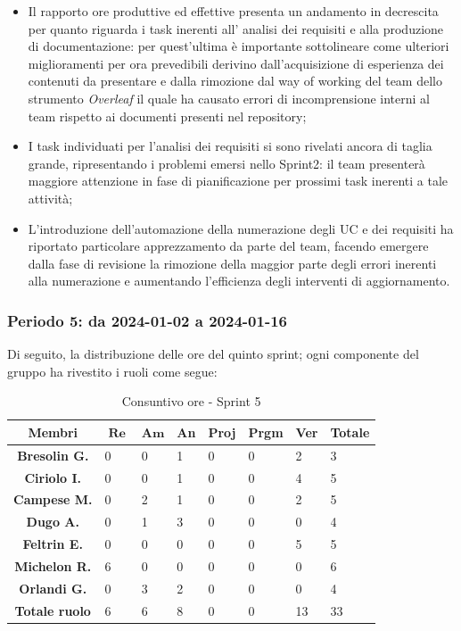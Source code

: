\documentclass[10pt, a4paper]{article}
\begin{document}
{{{{{{{{{{{{{{{{{\begin{itemize}
\item Il rapporto ore produttive ed effettive presenta un andamento in decrescita per quanto riguarda i task inerenti all' analisi dei requisiti e alla produzione di documentazione: per 
quest'ultima è importante sottolineare come ulteriori miglioramenti per ora prevedibili derivino dall'acquisizione di esperienza dei contenuti da presentare e dalla rimozione dal way of working del team
dello strumento \textit{Overleaf} il quale ha causato errori di incomprensione interni al team rispetto ai documenti presenti nel repository;
\item I task individuati per l'analisi dei requisiti si sono rivelati ancora di taglia grande, ripresentando i problemi emersi nello Sprint2: il team presenterà maggiore attenzione
in fase di pianificazione per prossimi task inerenti a tale attività;
\item L'introduzione dell'automazione della numerazione degli UC e dei requisiti ha riportato particolare apprezzamento da parte del team, facendo emergere dalla fase di revisione
la rimozione della maggior parte degli errori inerenti alla numerazione e aumentando l'efficienza degli interventi di aggiornamento. 
\end{itemize}
 

\subsubsection{Periodo 5: da 2024-01-02 a 2024-01-16}
Di seguito, la distribuzione delle ore del quinto sprint; ogni componente del gruppo ha rivestito i ruoli come segue:
\begin{table}[H]
    \begin{tabularx}{\textwidth}{c|X|X|X|X|X|X|X}
        \textbf{Membri} & $\operatorname{\textbf{Re}}$ & $\mathrm{\textbf{Am}}$ & \textbf{An} & \textbf{Proj} & \textbf{Prgm} & \textbf{Ver} & \textbf{Totale} \\
        \hline
        \textbf{Bresolin G.} & 0 & 0 & 1 & 0 & 0 & 2 & 3 \\
        \hline
        \textbf{Ciriolo I.}  & 0 & 0 & 1 & 0 & 0 & 4 & 5 \\
        \hline
        \textbf{Campese M.}  & 0 & 2 & 1 & 0 & 0 & 2 & 5 \\
        \hline
        \textbf{Dugo A.}     & 0 & 1 & 3 & 0 & 0 & 0 & 4 \\
        \hline
        \textbf{Feltrin E.}  & 0 & 0 & 0 & 0 & 0 & 5 & 5 \\
        \hline
        \textbf{Michelon R.} & 6 & 0 & 0 & 0 & 0 & 0 & 6 \\
        \hline
        \textbf{Orlandi G.}  & 0 & 3 & 2 & 0 & 0 & 0 & 4 \\
        \hline
        \textbf{Totale ruolo} & 6 & 6 & 8 & 0 & 0 & 13 & 33 \\
    \end{tabularx}
    \caption{Consuntivo ore - Sprint 5}
\end{table}

}}}}}}}}}}}}}}}}}
\end{document}

